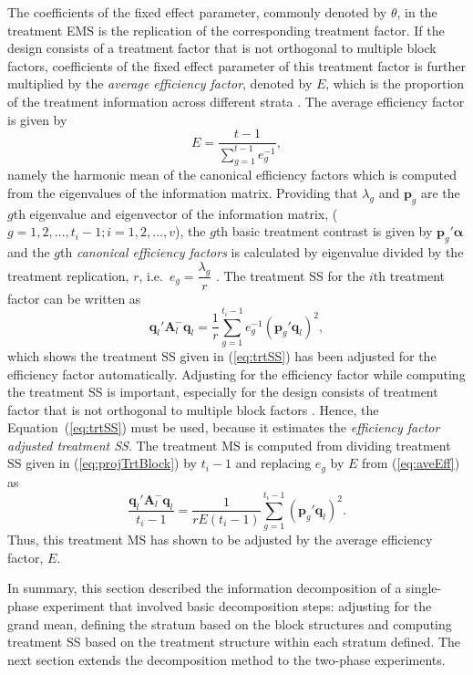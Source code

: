 \documentclass[article]{jss}
\newcommand{\A}{\mathbf{A}}
\begin{document}
The coefficients of the fixed effect parameter, commonly denoted by $\theta$, in the treatment EMS is the replication of the corresponding treatment factor. If the design consists of a treatment factor that is not orthogonal to multiple block factors, coefficients of the fixed effect parameter of this treatment factor is further multiplied by the \emph{average efficiency factor}, denoted by $E$, which is the proportion of the treatment information across different strata \citep{Yates1936}. The average efficiency factor is given by
\begin{equation}\label{eq:aveEff}
E = \dfrac{t-1}{\sum^{t - 1}_{g = 1} e_g^{-1}},
\end{equation}
namely the harmonic mean of the canonical efficiency factors which is computed from the eigenvalues of the information matrix. Providing that $\lambda_g$ and $\bm{p}_g$ are the $g$th eigenvalue and eigenvector of the information matrix, ($g = 1,2,\dots,t_i - 1; i = 1,2,\dots,v$), the $g$th basic treatment contrast is given by $\bm{p}_g'\bm{\alpha}$ and the $g$th \emph{canonical efficiency factors} is calculated by eigenvalue divided by the treatment replication, $r$, i.e.\ $e_g = \dfrac{\lambda_g}{r}$ \citep{John1987}. The treatment SS for the $i$th treatment factor can be written as 
\begin{equation}\label{eq:projTrtBlock}
 \bm{q}_{l}' \A_{l}^{-} \bm{q}_{l} = \dfrac{1}{r} \sum^{t_i - 1}_{g = 1} e_g^{-1} (\bm{p}_g' \bm{q}_{l})^2,
\end{equation}
which shows the treatment SS given in (\ref{eq:trtSS}) has been adjusted for the efficiency factor automatically. Adjusting for the efficiency factor while computing the treatment SS is important, especially for the design consists of treatment factor that is not orthogonal to multiple block factors \citep{Brien2009}. Hence, the Equation~(\ref{eq:trtSS}) must be used, because it estimates the \emph{efficiency factor adjusted treatment SS}. The treatment MS is computed from dividing treatment SS given in (\ref{eq:projTrtBlock}) by $t_i - 1$ and replacing $e_g$ by $E$ from (\ref{eq:aveEff}) as
\begin{equation}\label{eq:projTrtBlockAveEff}
 \dfrac{\bm{q}_{l}' \A_{l}^{-} \bm{q}_{l}}{t_i - 1} = \dfrac{1}{r E (t_i - 1)}\sum^{t_i - 1}_{g = 1} (\bm{p}_g' \bm{q}_{l})^2.
\end{equation}
Thus, this treatment MS has shown to be adjusted by the average efficiency factor, $E$. 

In summary, this section described the information decomposition of a single-phase experiment that involved basic decomposition steps: adjusting for the grand mean, defining the stratum based on the block structures and computing treatment SS based on the treatment structure within each stratum defined. The next section extends the decomposition method to the two-phase experiments.  
\end{document}

